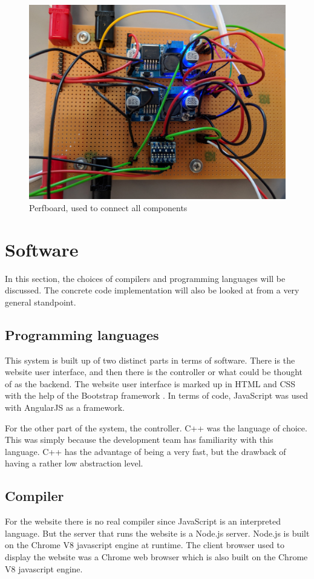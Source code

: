 \begin{figure}[H]
\centering
\includegraphics[width=0.7\linewidth]{../Appendix/Project/Dokumentation/Images/Implementation/integration}
\caption{Perfboard, used to connect all components}
\label{fig:integration}
\end{figure}

\section{Software}
In this section, the choices of compilers and programming languages will be discussed. The concrete code implementation will also be looked at from a very general standpoint.

\subsection{Programming languages}
This system is built up of two distinct parts in terms of software. There is the website user interface, and then there is the controller or what could be thought of as the backend. The website user interface is marked up in HTML and CSS with the help of the Bootstrap framework \cite{bootstrap}. In terms of code, JavaScript was used with AngularJS as a framework. 

For the other part of the system, the controller. C++ was the language of choice. This was simply because the development team has familiarity with this language. C++ has the advantage of being a very fast, but the drawback of having a rather low abstraction level. 
 
\subsection{Compiler}
For the website there is no real compiler since JavaScript is an interpreted language. But the server that runs the website is a Node.js server. Node.js is built on the Chrome V8 javascript engine at runtime. The client browser used to display the website was a Chrome web browser which is also built on the Chrome V8 javascript engine. 

